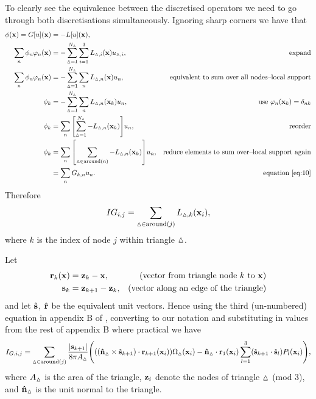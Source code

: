 To clearly see the equivalence between the discretised operators we need to go through both discretisations simultaneously.
Ignoring sharp corners we have that
\begin{equation}
  \begin{aligned}
    \phim(\xv) = G[\phione](\xv) &= -L[\phione](\xv), \\
    \sum_{n} \phim_n \tbf_n(\xv)
    &= - \sum_{\tri=1}^{N_\tri} \sum_{i=1}^{3} L_{\tri,i}(\xv) \phione_{\tri,i},
    \quad\quad&\text{expand}\\
    \sum_{n} \phim_n \tbf_n(\xv)
    &= - \sum_{\tri=1}^{N_\tri} \sum_n L_{\tri,n}(\xv) \phione_n,
    &\text{equivalent to sum over all nodes--local support}\\
    \phim_k &= - \sum_{\tri=1}^{N_\tri} \sum_n L_{\tri,n}(\xv_k) \phione_n,
    &\text{use $\tbf_n(\xv_k) = \delta_{nk}$}\\
    \phim_k &= \sum_n \bigs{\sum_{\tri=1}^{N_\tri} -L_{\tri,n}(\xv_k)} \phione_n,
    &\text{reorder}\\
    \phim_k &= \sum_n \bigs{\sum_{\tri \in \text{around}(n)} -L_{\tri,n}(\xv_k)} \phione_n,
    &\text{reduce elements to sum over--local support again}\\
    &= \sum_n G_{k,n} \phione_n.
    &\text{equation~\cref{eq:10}}
  \end{aligned}
\end{equation}
Therefore
\begin{equation}
  IG_{i,j} = \sum_{\vartriangle \in \text{around}(j)} L_{\vartriangle,k}(\boldsymbol{\mathrm{x}}_i),
\end{equation}
where $k$ is the index of node $j$ within triangle $\vartriangle$.

Let
\begin{equation}
  \begin{aligned}
    \boldsymbol{\mathrm{r}}_k(\boldsymbol{\mathrm{x}}) &= \boldsymbol{\mathrm{z}}_k - \boldsymbol{\mathrm{x}}, &\quad \text{(vector from triangle node $k$ to $\boldsymbol{\mathrm{x}}$)} \\
    {\boldsymbol{\mathrm{s}}}_k &= \boldsymbol{\mathrm{z}}_{k+1} - \boldsymbol{\mathrm{z}}_k, & \text{(vector along an edge of the triangle)} \\
  \end{aligned}
\end{equation}
and let $\hat{{\boldsymbol{\mathrm{s}}}}$, $\hat{\boldsymbol{\mathrm{r}}}$ be the equivalent unit vectors.
Hence using the third (un-numbered) equation in appendix B of \cite{Lindholm1984}, converting to our notation and substituting in values from the rest of appendix B where practical we have
\begin{equation}
  \begin{aligned}
    \label{eq:analytic-bem-integral}
    I_{G,i,j} &= \sum_{\vartriangle \in \text{around}(j)} \frac{\left|{{\boldsymbol{\mathrm{s}}}_{k+1}} \right|}{8 \pi A_\vartriangle} {\left( 
      {\left( (\boldsymbol{\mathrm{\hat{n}}}_\vartriangle \times \hat{{\boldsymbol{\mathrm{s}}}}_{k+1}) \cdot \boldsymbol{\mathrm{r}}_{k+1}(\boldsymbol{\mathrm{x}}_i) \right)} \Omega_\vartriangle(\boldsymbol{\mathrm{x}}_i)
      - \boldsymbol{\mathrm{\hat{n}}}_\vartriangle \cdot \boldsymbol{\mathrm{r}}_1(\boldsymbol{\mathrm{x}}_i) \sum_{l=1}^{3} (\hat{{\boldsymbol{\mathrm{s}}}}_{k+1} \cdot \hat{{\boldsymbol{\mathrm{s}}}}_l) P_l(\boldsymbol{\mathrm{x}}_i)
     \right)}, \\
  \end{aligned}
\end{equation}
where $A_\vartriangle$ is the area of the triangle, $\boldsymbol{\mathrm{z}}_i$ denote the nodes of triangle $\vartriangle$ (mod 3), and $\boldsymbol{\mathrm{\hat{n}}}_\vartriangle$ is the unit normal to the triangle.

